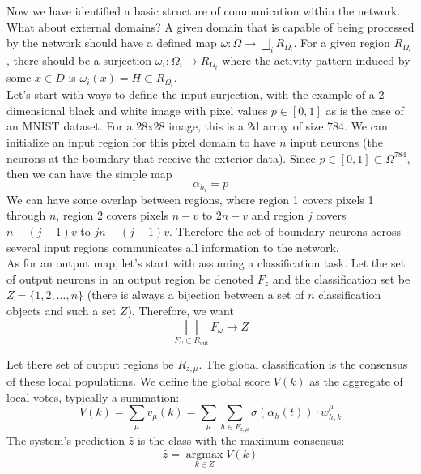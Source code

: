 \documentclass[11pt]{article}
\begin{document}
Now we have identified a basic structure of communication within the network. What about external domains? A given domain that is capable of being processed by the network should have a defined map $\omega: \Omega \to \bigsqcup_i R_{\Omega_i}$. For a given region $R_{\Omega_i}$, there should be a surjection $\omega_i: \Omega_i \to R_{\Omega_i}$ where the activity pattern induced by some $x \in D$ is $\omega_i(x) = H \subset R_{\Omega_i}$.\\

Let's start with ways to define the input surjection, with the example of a 2-dimensional black and white image with pixel values $p \in [0,1]$ as is the case of an MNIST dataset. For a 28x28 image, this is a 2d array of size 784. We can initialize an input region for this pixel domain to have $n$ input neurons (the neurons at the boundary that receive the exterior data). Since $p \in  [0,1] \subset \Omega^{784}$, then we can have the simple map
\begin{equation}
    \alpha_{h_i} = p 
\end{equation}
We can have some overlap between regions, where region 1 covers pixels 1 through $n$, region 2 covers pixels $n-v$ to $2n -v$ and region $j$ covers $n-(j-1)v$ to $jn - (j-1)v$. Therefore the set of boundary neurons across several input regions communicates all information to the network. \\

As for an output map, let's start with assuming a classification task. Let the set of output neurons in an output region be denoted $F_z$ and the classification set be $Z = \{1,2,...,n\}$ (there is always a bijection between a set of $n$ classification objects and such a set $Z$). Therefore, we want 
\begin{equation}
    \bigsqcup_{F_\omega \subset R_{\mathrm{out}}} F_{\omega} \to Z 
\end{equation}

Let there set of output regions be $R_{z,\mu}$. The global classification is the consensus of these local populations. We define the global score $V(k)$ as the aggregate of local votes, typically a summation:
\begin{equation}
V(k) = \sum_{\mu} v_\mu(k) = \sum_{\mu} \sum_{h \in F_{z, \mu}} \sigma(\alpha_h(t)) \cdot w_{h, k}^\mu
\end{equation}
The system's prediction $\hat{z}$ is the class with the maximum consensus:
\begin{equation}
\hat{z} = \operatorname*{argmax}_{k \in Z} V(k)
\end{equation}
\end{document}
